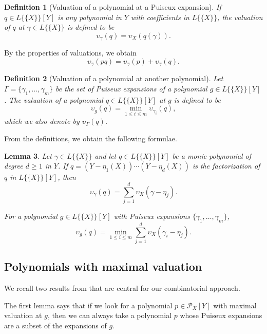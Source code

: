 \documentclass[a4paper,11pt]{amsart}%
\theoremstyle{definition}
\theoremstyle{plain}
\newtheorem{defn}{Definition}[section]
\newtheorem{lemma}[defn]{Lemma}
\theoremstyle{remark}
\begin{document}
\begin{defn}[Valuation of a polynomial at a Puiseux expansion]
If $q\in L\{\{X\}\}[Y]$ is any polynomial in $Y$ with coefficients in
$L\{\{X\}\}$, the {\emph{valuation}} of $q$ at $\gamma\in L\{\{X\}\}$ is
defined to be
$$\upsilon_{\gamma}(q)=\upsilon_X(q(\gamma)).$$
\end{defn}

By the properties of valuations, we obtain
$$
\upsilon_{\gamma}(pq)= \upsilon_{\gamma}(p) + \upsilon_{\gamma}(q).
$$




\begin{defn}[Valuation of a polynomial at another polynomial]
Let $\Gamma=\{\gamma_{1},\dots,\gamma_{m}\}$ be the set of Puiseux
expansions of a polynomial $g \in L\{\{X\}\}[Y]$. The {\emph{valuation}} of a polynomial $q\in L\{\{X\}\}[Y]$
at $g$ is defined to be
$$\upsilon_{g}(q)=\min_{1 \leq i \leq m} \upsilon_{\gamma_{i}}(q),$$
which we also denote by $\upsilon_{\Gamma}(q)$.
\end{defn}

From the definitions, we obtain the following formulae.

\begin{lemma}
\label{lemma:gammaAtq}
Let $\gamma \in L\{\{X\}\}$ and let $q \in L\{\{X\}\}[Y]$ be a monic polynomial of degree $d\geq 1$ in $Y$.  %
If $q=(Y-\eta_{1}(X))\cdots(Y-\eta_{d}(X))$ is the factorization of $q$ in $L\{\{X\}\}[Y]$, then
\[
\upsilon_{\gamma}(q)= \sum_{j=1}^{d}\upsilon_X(\gamma-\eta_{j}).
\]

For a polynomial $g \in L\{\{X\}\}[Y]$ with Puiseux expansions $\{\gamma_{1},\dots,\gamma_{m}\}$,
\[
\upsilon_{g}(q)=\min_{1 \leq i \leq m}\sum_{j=1}^{d}\upsilon_X(\gamma_{i}-\eta_{j})\text{.}%
\]
\end{lemma}

\subsection{Polynomials with maximal valuation}
We recall two results from \cite{intbas} that are central for our combinatorial approach.

The first lemma says that if we look for a polynomial $p \in {\mathcal{P}_{X}}[Y]$ with maximal valuation at $g$, then we can always take a polynomial $p$ whose Puiseux expansions are a subset of the expansions of $g$.
\end{document}
